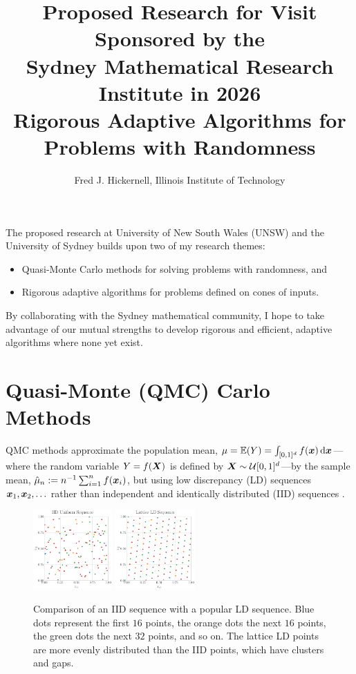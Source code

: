 \documentclass{amsart}
\begin{document}
\title{Proposed Research for Visit Sponsored by the \\
Sydney Mathematical Research Institute in 2026 \\
\bigskip 
\large{Rigorous Adaptive Algorithms for Problems with Randomness}}
\author{Fred J. Hickernell, Illinois Institute of Technology}

\maketitle

The proposed research at University of New South Wales (UNSW) and the University of Sydney builds upon two of my research themes:
\begin{itemize}
    \item Quasi-Monte Carlo methods for solving problems with randomness, and
    \item Rigorous adaptive algorithms for problems defined on cones of inputs.
\end{itemize}
By collaborating with the Sydney mathematical community, I hope to take advantage of our mutual strengths to develop rigorous and efficient, adaptive algorithms where none yet exist.

\section{Quasi-Monte (QMC) Carlo Methods }
QMC methods approximate the population mean, $\mu=\operatorname{\mathbb{E}}(Y) = \int_{[0,1]^d} f(\boldsymbol{x}) \, {\rm d} \boldsymbol{x}$---where the random variable $Y = f(\boldsymbol{X})$ is defined by $\boldsymbol{X} \sim \mathcal{U}[0,1]^d$---by the sample mean, $\hat{\mu}_n := n^{-1} \sum_{i=1}^n f(\boldsymbol{x}_i)$, but using low discrepancy (LD) sequences $\boldsymbol{x}_1, \boldsymbol{x}_2, \ldots$ rather than independent and identically distributed (IID) sequences \cite{DicEtal22a,DicEtal14a,DicPil10a}.

\begin{figure}[h]
\centering
\includegraphics[width = 0.27\textwidth]{Figures/Uniform.pdf} \qquad 
\includegraphics[width = 0.27\textwidth]{Figures/Lattice.pdf}
    \caption{Comparison of an IID sequence with a popular LD sequence.  Blue dots represent the first $16$ points, the orange dots the next $16$ points, the green dots the next $32$ points, and so on.  The lattice LD points are more evenly distributed than the IID points, which have clusters and gaps. \label{fig:points}}
\end{figure}
\end{document}
